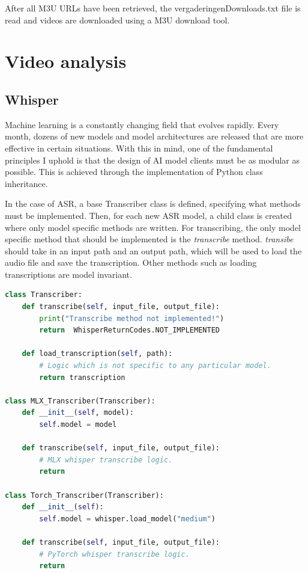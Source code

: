 \documentclass[twoside]{uva-inf-bachelor-thesis}
\begin{document}
After all M3U URLs have been retrieved, the vergaderingenDownloads.txt file is read and videos are downloaded using a M3U download tool. 


\section{Video analysis}
\subsection{Whisper}
Machine learning is a constantly changing field that evolves rapidly. Every month, dozens of new models and model architectures are released that are more effective in certain situations. 
With this in mind, one of the fundamental principles I uphold is that the design of AI model clients must be as modular as possible. 
This is achieved through the implementation of Python class inheritance. 

In the case of ASR, a base Transcriber class is defined, specifying what methods must be implemented. Then, for each new ASR model, a child class is created where only model specific methods are written. For transcribing, the only model specific method that should be implemented is the \textit{transcribe} method. \textit{transibe} should take in an input path and an output path, which will be used to load the audio file and save the transcription. 
Other methods such as loading transcriptions are model invariant.


\begin{lstlisting}[language=Python, caption={Modular transcriber class implemented in Apple's MLX Whisper port and PyTorch's Whisper port.}]
class Transcriber:
    def transcribe(self, input_file, output_file):
        print("Transcribe method not implemented!")
        return  WhisperReturnCodes.NOT_IMPLEMENTED

    def load_transcription(self, path):
        # Logic which is not specific to any particular model.
        return transcription

class MLX_Transcriber(Transcriber):
    def __init__(self, model):
        self.model = model

    def transcribe(self, input_file, output_file):
        # MLX whisper transcribe logic.
        return

class Torch_Transcriber(Transcriber):
    def __init__(self):
        self.model = whisper.load_model("medium")

    def transcribe(self, input_file, output_file):
        # PyTorch whisper transcribe logic.
        return
\end{lstlisting}
\end{document}
